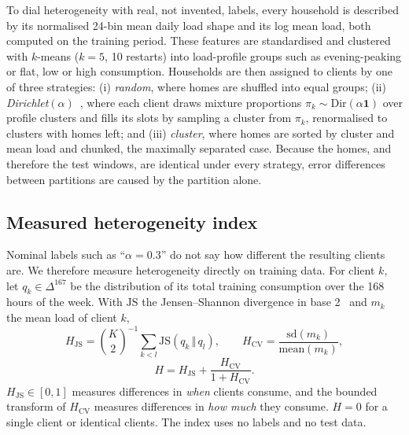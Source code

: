 To dial heterogeneity with real, not invented, labels, every household is described by its normalised 24-bin mean
daily load shape and its log mean load, both computed on the training period. These features are standardised and
clustered with $k$-means ($k=5$, 10 restarts) into load-profile groups such as evening-peaking or flat, low or high consumption.
Households are then assigned to clients by one of three strategies:
(i) \emph{random}, where homes are shuffled into equal groups;
(ii) \emph{Dirichlet}$(\alpha)$~\cite{hsu2019dirichlet}, where each client draws mixture proportions
$\pi_k\sim\mathrm{Dir}(\alpha\mathbf{1})$ over profile clusters and fills its slots by sampling a cluster from
$\pi_k$, renormalised to clusters with homes left; and
(iii) \emph{cluster}, where homes are sorted by cluster and mean load and chunked, the maximally separated case.
Because the homes, and therefore the test windows, are identical under every strategy, error differences between
partitions are caused by the partition alone.

\subsection{Measured heterogeneity index}\label{sec:hindex}
Nominal labels such as ``$\alpha=0.3$'' do not say how different the resulting clients are. We therefore measure
heterogeneity directly on training data. For client $k$, let $q_k\in\Delta^{167}$ be the distribution of its total
training consumption over the 168 hours of the week. With $\mathrm{JS}$ the Jensen--Shannon divergence in
base 2~\cite{lin1991divergence} and $m_k$ the mean load of client $k$,
\begin{equation}
H_{\mathrm{JS}}=\binom{K}{2}^{-1}\sum_{k<l}\mathrm{JS}(q_k\,\Vert\,q_l),\qquad
H_{\mathrm{CV}}=\frac{\mathrm{sd}(m_k)}{\mathrm{mean}(m_k)},
\end{equation}
\begin{equation}
H=H_{\mathrm{JS}}+\frac{H_{\mathrm{CV}}}{1+H_{\mathrm{CV}}}.
\end{equation}
$H_{\mathrm{JS}}\in[0,1]$ measures differences in \emph{when} clients consume, and the bounded transform of
$H_{\mathrm{CV}}$ measures differences in \emph{how much} they consume. $H=0$ for a single client or identical
clients. The index uses no labels and no test data.

